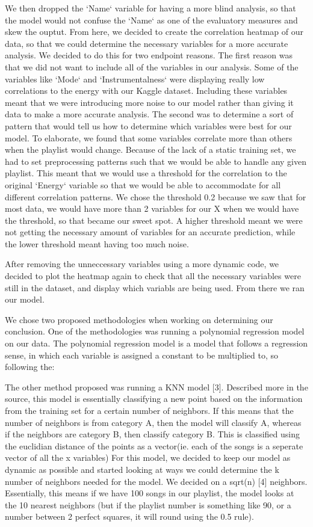 \documentclass{article}
\begin{document}
We then dropped the `Name` variable for having a more blind analysis, so that the model would not confuse the `Name` as one of the evaluatory measures and skew the ouptut. From here, we decided to 
create the correlation heatmap of our data, so that we could determine the necessary variables for a more accurate analysis. We decided to do this for two endpoint reasons. The first reason was that we did not want to include all of the variables in our analysis. Some of the variables like `Mode` and `Instrumentalness` were displaying really low correlations to the energy with our Kaggle dataset. Including these variables meant that we were introducing more noise to our model rather than giving it data to make a more accurate analysis. The second was to determine a sort of pattern that would tell us how to determine which variables were best for our model. To elaborate, we found that some variables correlate more than others when the playlist would change. Because of the lack of a static training set, we had to set preprocessing patterns such that we would be able to handle any given playlist. This meant that we would use a threshold for the correlation to the original `Energy` variable so that we would be able to accommodate for all different correlation patterns. We chose the threshold 0.2 because we saw that for most data, we would have more than 2 variables for our X when we would have the threshold, so that became our sweet spot. A higher threshold meant we were not getting the necessary amount of variables for an accurate prediction, while the lower threshold meant having too much noise. 

After removing the unneccessary variables using a more dynamic code, we decided to plot the heatmap again to check that all the necessary variables were still in the dataset, and display which variabls are being used. From there we ran our model.

We chose two proposed methodologies when working on determining our conclusion. 
One of the methodologies was running a polynomial regression model on our data.
The polynomial regression model is a model that follows a regression sense, in which each variable is assigned a constant to be multiplied to, so following the:

The other method proposed was running a KNN model [3]. Described more in the source, this model is essentially classifying a new point based on the information from the training set for a certain number of neighbors. If this means that the number of neighbors is from category A, then the model will classify A, whereas if the neighbors are category B, then classify category B. This is classified using the euclidian distance of the points as a vector(ie. each of the songs is a seperate vector of all the x variables) For this model, we decided to keep our model as dynamic as possible and started looking at ways we could determine the k number of neighbors needed for the model. We decided on a sqrt(n) [4] neighbors. Essentially, this means if we have 100 songs in our playlist, the model looks at the 10 nearest neighbors (but if the playlist number is something like 90, or a number between 2 perfect squares, it will round using the 0.5 rule).
\end{document}
